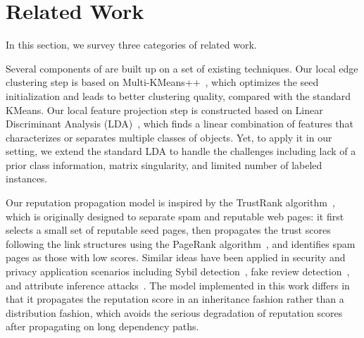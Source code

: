 
\section{Related Work}
\label{sec:literature}

In this section, we survey three categories of related work.

Several components of \tool are built up on a set of existing techniques. Our local edge clustering step is based on Multi-KMeans++~\cite{Arthur:2007:KAC:1283383.1283494}, which optimizes the seed initialization and leads to better clustering quality, compared with the standard KMeans. Our local feature projection step is constructed based on Linear Discriminant Analysis (LDA)~\cite{Mika99fisherdiscriminant}, which finds a linear combination of features that characterizes or separates multiple classes of objects. Yet, to apply it in our setting, we extend the standard LDA to handle the challenges including lack of a prior class information, matrix singularity, and limited number of labeled instances. 

Our reputation propagation model is inspired by the TrustRank algorithm~\cite{Gyongyi:2004:vldb}, which is originally designed to separate spam and reputable web pages: it first selects a small set of reputable seed pages, then propagates the trust scores following the link structures using the PageRank algorithm~\cite{Page:techreport:1998}, and identifies spam pages as those with low scores. Similar ideas have been applied in security and privacy application scenarios
including Sybil detection~\cite{cao2012sybilrank,Gong:2014:tifs,gao2018sybilfuse}, fake review detection~\cite{Rayana:2015:COS:2783258.2783370}, and attribute inference attacks~\cite{jia2017attriinfer,wang2018graph}.
The model implemented in this work differs in that it propagates the reputation score in an inheritance fashion rather than a distribution fashion, which avoids the serious degradation of reputation scores after propagating on long dependency paths.


